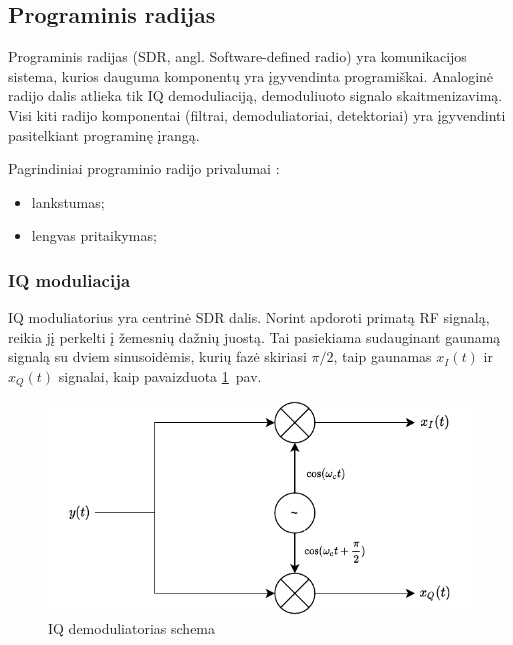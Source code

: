 \documentclass[main.tex]{subfiles}
\begin{document}
\subsection{Programinis radijas}

Programinis radijas (SDR, angl. Software-defined radio) yra komunikacijos sistema,
kurios dauguma komponentų yra įgyvendinta programiškai. Analoginė radijo dalis
atlieka tik IQ demoduliaciją, demoduliuoto signalo skaitmenizavimą.
Visi kiti radijo komponentai (filtrai, demoduliatoriai, detektoriai) yra įgyvendinti
pasitelkiant programinę įrangą.

Pagrindiniai programinio radijo privalumai \cite{Sadiku-2004}:
\begin{itemize}
    \item lankstumas;
    \item lengvas pritaikymas;
\end{itemize}

\subsubsection{IQ moduliacija}

IQ moduliatorius yra centrinė SDR dalis. Norint apdoroti primatą RF signalą, reikia
jį perkelti į žemesnių dažnių juostą. Tai pasiekiama sudauginant gaunamą signalą su dviem
sinusoidėmis, kurių fazė skiriasi $\pi/2$, taip gaunamas $x_I(t)$ ir $x_Q(t)$ signalai,
kaip pavaizduota \ref{fig:iq_modulator}~pav.

\begin{figure}[h]
    \begin{centering}
    \includegraphics[scale=1.0]{drawings/iq_modulator}
    \par\end{centering}
    \protect\caption{\label{fig:iq_modulator}IQ demoduliatorias schema}
\end{figure}
\end{document}
